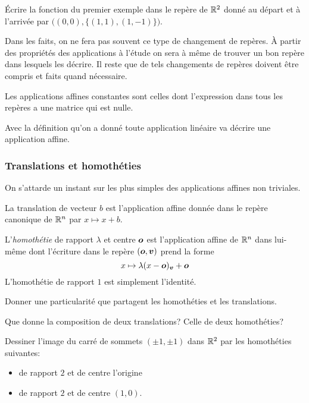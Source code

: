 \documentclass[11pt, a4paper]{article}
\begin{document}
\begin{question}
  Écrire la fonction du premier exemple dans le repère de $\mathbb{R}^2$ donné
  au départ et à l'arrivée par
  $\big((0, 0), \{(1, 1), (1, -1)\}\big)$.
\end{question}
\begin{rem}
  Dans les faits, on ne fera pas souvent ce type de changement de
  repères. À partir des propriétés des applications à l'étude on sera
  à même de trouver un bon repère dans lesquels les décrire. Il reste
  que de tels changements de repères doivent être compris et faits
  quand nécessaire.
\end{rem}
\begin{exmp}
  Les applications affines constantes sont celles dont l'expression
  dans tous les repères a une matrice qui est nulle.
\end{exmp}
\begin{exmp}
  Avec la définition qu'on a donné toute application linéaire va
  décrire une application affine.
\end{exmp}

\subsubsection{Translations et homothéties}

On s'attarde un instant sur les plus simples des applications affines
non triviales.
\begin{exmp}
  La translation de vecteur $b$ est l'application affine donnée dans
  le repère canonique de $\mathbb{R}^n$ par $x \mapsto x + b$.
\end{exmp}
\begin{exmp}
  L'\emph{homothétie} de rapport $\lambda$ et centre $\boldsymbol{o}$ est
  l'application affine de $\mathbb{R}^n$ dans lui-même dont l'écriture dans le
  repère $(\boldsymbol{o}, \boldsymbol{v})$ prend la forme
  \[
  x \mapsto \lambda (x - \boldsymbol{o})_{\boldsymbol{v}} + \boldsymbol{o}
  \]
  L'homothétie de rapport $1$ est simplement l'identité.
\end{exmp}
\begin{question}
  Donner une particularité que partagent les homothéties et les
  translations.
\end{question}
\begin{question}
  Que donne la composition de deux translations? Celle de deux
  homothéties?
\end{question}
\begin{question}
  Dessiner l'image du carré de sommets $(\pm 1, \pm 1)$
  dans $\mathbb{R}^2$ par les homothéties suivantes:
  \begin{itemize}
  \item
    de rapport $2$ et de centre l'origine
  \item
    de rapport $2$ et de centre $(1, 0)$.
  \end{itemize}
\end{question}
\end{document}
